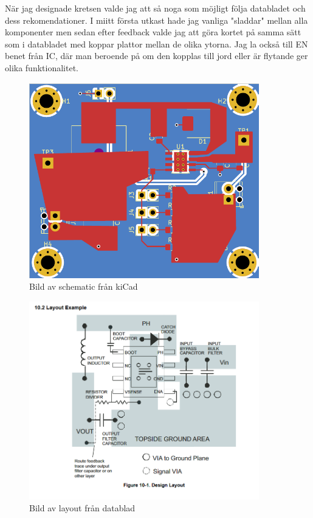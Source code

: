 \documentclass{article}
\begin{document}
När jag designade kretsen valde jag att så noga som möjligt följa databladet och dess
rekomendationer. I miitt första utkast hade jag vanliga "sladdar" mellan alla komponenter
men sedan efter feedback valde jag att göra kortet på samma sätt som i databladet med 
koppar plattor mellan de olika ytorna. Jag la också till EN benet från IC, där man
beroende på om den kopplas till jord eller är flytande ger olika funktionalitet. 

\begin{figure}[htp]
    \centering
    \includegraphics[width=10cm]{img/nylayout.png}
    \caption{Bild av schematic från kiCad}
\end{figure}

\begin{figure}[htp]
    \centering
    \includegraphics[width=10cm]{img/layout.png}
    \caption{Bild av layout från datablad}
\end{figure}
\end{document}
